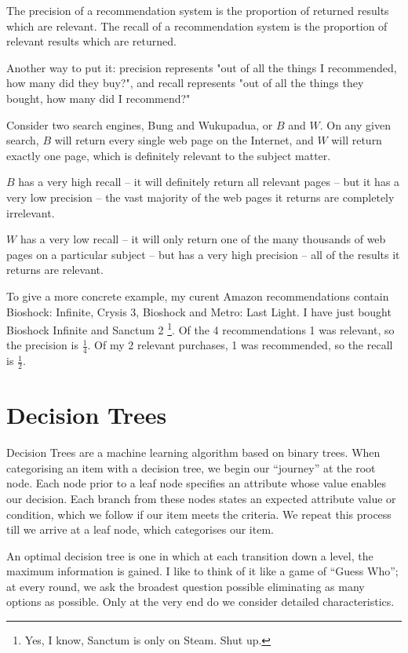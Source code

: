 \documentclass{article}
\begin{document}
    The precision of a recommendation system is the proportion of returned results which are relevant. The recall of a recommendation system is the proportion of relevant results which are returned.
    
    Another way to put it: precision represents "out of all the things I recommended, how many did they buy?", and recall represents "out of all the things they bought, how many did I recommend?"
    
    Consider two search engines, Bung and Wukupadua, or $B$ and $W$. On any given search, $B$ will return every single web page on the Internet, and $W$ will return exactly one page, which is definitely relevant to the subject matter.
    
    $B$ has a very high recall -- it will definitely return all relevant pages -- but it has a very low precision -- the vast majority of the web pages it returns are completely irrelevant.
    
    $W$ has a very low recall -- it will only return one of the many thousands of web pages on a particular subject -- but has a very high precision -- all of the results it returns are relevant.
    
    To give a more concrete example, my curent Amazon recommendations contain Bioshock: Infinite, Crysis 3, Bioshock and Metro: Last Light. I have just bought Bioshock Infinite and Sanctum 2 \footnote{Yes, I know, Sanctum is only on Steam. Shut up.}. Of the 4 recommendations 1 was relevant, so the precision is $\frac{1}{4}$. Of my 2 relevant purchases, 1 was recommended, so the recall is $\frac{1}{2}$.
    
\section{Decision Trees}
    Decision Trees are a machine learning algorithm based on binary trees. When categorising an item with a decision tree, we begin our ``journey'' at the root node. Each node prior to a leaf node specifies an attribute whose value enables our decision. Each branch from these nodes states an expected attribute value or condition, which we follow if our item meets the criteria. We repeat this process till we arrive at a leaf node, which categorises our item.
    
    An optimal decision tree is one in which at each transition down a level, the maximum information is gained. I like to think of it like a game of ``Guess Who''; at every round, we ask the broadest question possible eliminating as many options as possible. Only at the very end do we consider detailed characteristics.
    
\end{document}
